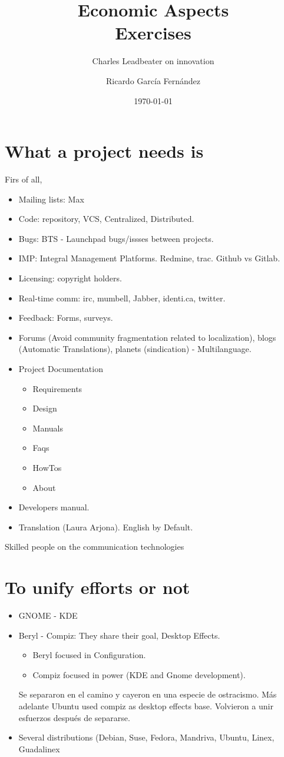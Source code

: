 \documentclass[11pt]{scrartcl}
\title{\textbf{Economic Aspects\\
                Exercises}}
\subtitle{Charles Leadbeater on innovation}
\author{Ricardo Garc\'ia Fern\'andez}
\date{\today}
\begin{document}
\section{What a project needs is}

Firs of all, 

\begin{itemize}
    \item Mailing lists: Max
	\item Code: repository, VCS, Centralized, Distributed.
	\item Bugs: BTS - Launchpad bugs/issses between projects.
	\item IMP: Integral Management Platforms. Redmine, trac. Github vs Gitlab.
	\item Licensing: copyright holders.
	\item Real-time comm: irc, mumbell, Jabber, identi.ca, twitter.
	\item Feedback: Forms, surveys.
	\item Forums  (Avoid community fragmentation related to localization), blogs (Automatic Translations), planets (sindication) - Multilanguage.
	\item Project Documentation
	\begin{itemize}
	    \item Requirements
	    \item Design
	    \item Manuals
	    \item Faqs
	    \item HowTos
	    \item About
    \end{itemize}
    \item Developers manual.
    \item Translation (Laura Arjona). English by Default.
\end{itemize}

Skilled people on the communication technologies

\section{To unify efforts or not}

\begin{itemize}
	\item GNOME - KDE
	\item Beryl - Compiz: They share their goal, Desktop Effects.
	\begin{itemize}
	    \item Beryl focused in Configuration.
	    \item Compiz focused in power (KDE and Gnome development).
    \end{itemize}
    Se separaron en el camino y cayeron en una especie de ostracismo.
    Más adelante Ubuntu used compiz as desktop effects base. Volvieron a unir esfuerzos después de separarse.
	\item Several distributions (Debian, Suse, Fedora, Mandriva, Ubuntu, Linex, Guadalinex
\end{itemize}
\end{document}
